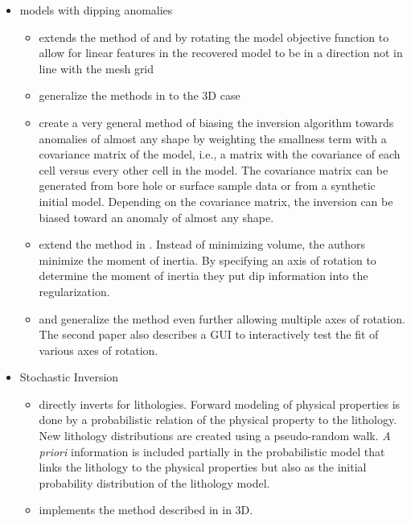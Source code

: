 \begin{itemize}
\begin{itemize}
\end{itemize}
\item models with dipping anomalies
\begin{itemize}
\item \cite{li2000incorporating}  extends the method of \cite{li19963} and \cite{li19983} by rotating the model objective function to allow for linear features in the recovered model to be in a direction not in line with the mesh grid
\item \cite{lelievre2009comprehensive} generalize the methods in \cite{li2000incorporating} to the 3D case
\item \cite{chasseriau20033d} create a very general method of biasing the inversion algorithm towards anomalies of almost any shape by weighting the smallness term with a covariance matrix of the model, i.e., a matrix with the covariance of each cell versus every other cell in the model. The covariance matrix can be generated from bore hole or surface sample data or from a synthetic initial model. Depending on the covariance matrix, the inversion can be biased toward an anomaly of almost any shape.
\item \cite{guillen1984gravity} extend the method in \cite{last1983compact}. Instead of minimizing volume, the authors minimize the moment of inertia. By specifying an axis of rotation to determine the moment of inertia they put dip information into the regularization.
\item \cite{barbosa1994generalized} and \cite{barbosa2006interactive} generalize the method even further allowing multiple axes of rotation. The second paper also describes a GUI to interactively test the fit of various axes of rotation.
\end{itemize}
\item Stochastic Inversion
\begin{itemize}
\item \cite{bosch2001lithologic} directly inverts for lithologies. Forward modeling of physical properties is done by a probabilistic relation of the physical property to the lithology. New lithology distributions are created using a pseudo-random walk. \emph{A priori} information is included partially in the probabilistic model that links the lithology to the physical properties but also as the initial probability distribution of the lithology model.
\item \cite{guillen2008geological} implements the method described in \cite{bosch2001lithologic} in 3D.
\end{itemize}

\end{itemize}
